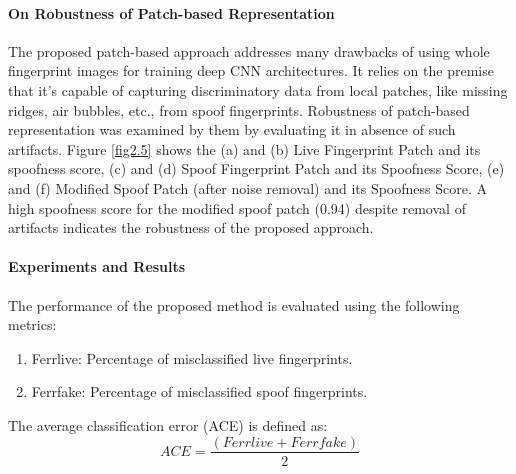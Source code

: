 \paragraph{On Robustness of Patch-based Representation}
The proposed patch-based approach addresses many drawbacks of using whole fingerprint images for training deep CNN architectures. It relies on the premise that it's capable of capturing discriminatory data from local patches, like missing ridges, air bubbles, etc., from spoof fingerprints. Robustness of patch-based representation was examined by them by evaluating it in absence of such artifacts. Figure \ref{fig2.5} shows the (a) and (b) Live Fingerprint Patch and its spoofness score, (c) and (d) Spoof Fingerprint Patch and its Spoofness Score, (e) and (f) Modified Spoof Patch (after	noise removal) and 	its Spoofness Score. A high spoofness score for the modified spoof patch (0.94) despite removal of artifacts indicates the robustness of the proposed approach. 

\paragraph{\textbf{Experiments and Results}}
 The performance of the proposed method is evaluated using the following metrics:
    \begin{enumerate}
	\item Ferrlive: Percentage of misclassified live fingerprints. 
	\item Ferrfake: Percentage of misclassified spoof fingerprints.
     \end{enumerate}  The average classification error (ACE) is defined as:
        \begin{equation}
           ACE =  \frac{(Ferrlive + Ferrfake)}{2} 
        \end{equation}
             
